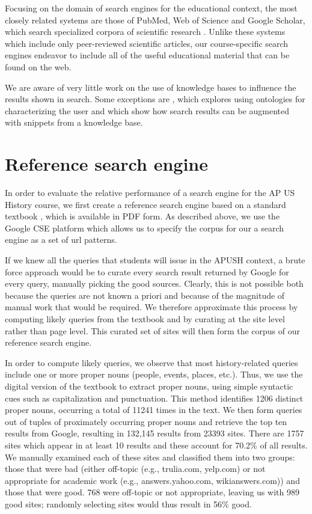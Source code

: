 \documentclass[pdfpagelabels=false,plainpages=true]{acm_proc_article-sp}
\begin{document}
Focusing on the domain of search engines for the educational context, the most
closely related systems are those of PubMed, Web of Science and Google
Scholar, which search specialized corpora of scientific research
\cite{jacso2005google}. Unlike these systems which include only
peer-reviewed scientific articles, our course-specific search engines
endeavor to include all of the useful educational material that can be found on
the web. 

We are aware of very little work on the use of knowledge bases to influence the
results shown in search. Some exceptions are \cite{jiang2009learning}, which explores
using ontologies for characterizing the user and \cite{guha2003semantic} which
show how search results can be augmented with snippets from a knowledge base.   

\section{Reference search engine}

In order to evaluate the relative performance of a search engine for the AP US
History course, we first create a reference search engine based on a standard textbook
\cite{textbook}, which is available in PDF form. As described above,
we use the Google CSE platform which allows us to specify the corpus for our a
search engine as a set of url patterns.

If we knew all the queries that students will issue in the APUSH context, a
brute force approach would be to curate every search result returned by
Google for every query, manually picking the good sources. Clearly, this is not possible both
because the queries are not known a priori and because of the magnitude of manual
work that would be required. We therefore approximate this process by computing likely
queries from the textbook and by curating at the site level rather than page
level. This curated set of sites will then form the corpus of our reference
search engine. 

In order to compute likely queries, we observe that most history-related queries
include one or more proper nouns (people, events, 
places, etc.). Thus, we use the digital version of the textbook \cite{textbook}
to extract proper nouns, using simple syntactic cues such as
capitalization and punctuation. This method identifies 1206 distinct proper
nouns, occurring a total of 11241 times in the text. We then form queries out of
tuples of proximately occurring proper nouns and retrieve the top ten results
from Google, resulting in 132,145 results from 23393 sites. There are
1757 sites which appear in at least 10 results and these account for 70.2\% of
all results. We manually examined each of these sites and classified them into two
groups: those that were bad (either off-topic (e.g., trulia.com, yelp.com)
or not appropriate for academic work (e.g., answers.yahoo.com, wikianswers.com))
and those that were good. 768 were off-topic or not appropriate, leaving us with
989 good sites; randomly selecting sites would thus result in 56\% good.
\end{document}
